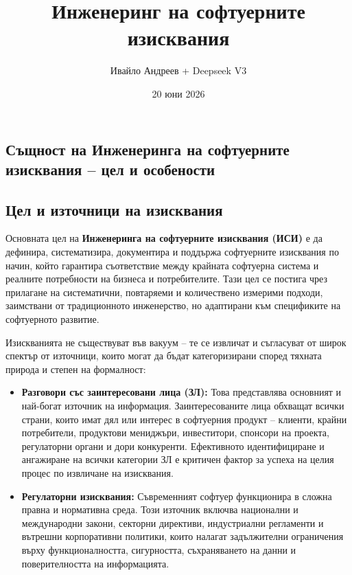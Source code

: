 \documentclass{scrartcl}
\title{Инженеринг на софтуерните изисквания}
\author{Ивайло Андреев + Deepseek V3}
\date{20 юни 2026}
\begin{document}
\maketitle
\tableofcontents
\newpage

\begin{FlushLeft}

\section{Същност на Инженеринга на софтуерните изисквания -- цел и особености}

\subsection{Цел и източници на изисквания}

Основната цел на \textbf{Инженеринга на софтуерните изисквания (ИСИ)} е да дефинира, систематизира, документира и поддържа софтуерните изисквания по начин, който гарантира съответствие между крайната софтуерна система и реалните потребности на бизнеса и потребителите. Тази цел се постига чрез прилагане на систематични, повтаряеми и количествено измерими подходи, заимствани от традиционното инженерство, но адаптирани към спецификите на софтуерното развитие.

Изискванията не съществуват във вакуум -- те се извличат и съгласуват от широк спектър от източници, които могат да бъдат категоризирани според тяхната природа и степен на формалност:

\begin{itemize}
    \item \textbf{Разговори със заинтересовани лица (ЗЛ):} Това представлява основният и най-богат източник на информация. Заинтересованите лица обхващат всички страни, които имат дял или интерес в софтуерния продукт -- клиенти, крайни потребители, продуктови мениджъри, инвеститори, спонсори на проекта, регулаторни органи и дори конкуренти. Ефективното идентифициране и ангажиране на всички категории ЗЛ е критичен фактор за успеха на целия процес по извличане на изисквания.
    
    \item \textbf{Регулаторни изисквания:} Съвременният софтуер функционира в сложна правна и нормативна среда. Този източник включва национални и международни закони, секторни директиви, индустриални регламенти и вътрешни корпоративни политики, които налагат задължителни ограничения върху функционалността, сигурността, съхраняването на данни и поверителността на информацията.
    

\end{itemize}
\end{FlushLeft}
\end{document}
